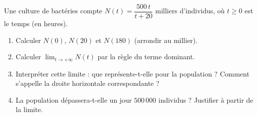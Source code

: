 \documentclass[11pt,a4paper]{article}
\begin{document}
\begin{exercice}
Une culture de bactéries compte $N(t)=\dfrac{500\,t}{t+20}$ milliers d'individus, où $t\geq 0$ est le
temps (en heures).
\begin{enumerate}[label=\alph*),leftmargin=2em,itemsep=3pt]
  \item Calculer $N(0)$, $N(20)$ et $N(180)$ (arrondir au millier).
  \item Calculer $\displaystyle\lim_{t\to+\infty} N(t)$ par la règle du terme dominant.
  \item Interpréter cette limite : que représente-t-elle pour la population ? Comment s'appelle la droite
        horizontale correspondante ?
  \item La population dépassera-t-elle un jour $500\,000$ individus ? Justifier à partir de la limite.
\end{enumerate}
\end{exercice}
\end{document}
